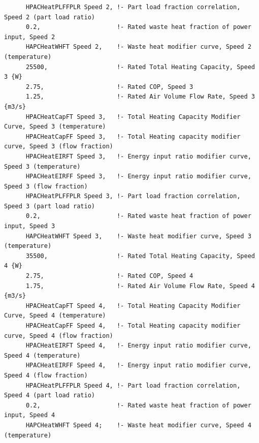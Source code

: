 \begin{lstlisting}
      HPACHeatPLFFPLR Speed 2, !- Part load fraction correlation, Speed 2 (part load ratio)
      0.2,                     !- Rated waste heat fraction of power input, Speed 2
      HAPCHeatWHFT Speed 2,    !- Waste heat modifier curve, Speed 2 (temperature)
      25500,                   !- Rated Total Heating Capacity, Speed 3 {W}
      2.75,                    !- Rated COP, Speed 3
      1.25,                    !- Rated Air Volume Flow Rate, Speed 3 {m3/s}
      HPACHeatCapFT Speed 3,   !- Total Heating Capacity Modifier Curve, Speed 3 (temperature)
      HPACHeatCapFF Speed 3,   !- Total Heating capacity modifier curve, Speed 3 (flow fraction)
      HPACHeatEIRFT Speed 3,   !- Energy input ratio modifier curve, Speed 3 (temperature)
      HPACHeatEIRFF Speed 3,   !- Energy input ratio modifier curve, Speed 3 (flow fraction)
      HPACHeatPLFFPLR Speed 3, !- Part load fraction correlation, Speed 3 (part load ratio)
      0.2,                     !- Rated waste heat fraction of power input, Speed 3
      HAPCHeatWHFT Speed 3,    !- Waste heat modifier curve, Speed 3 (temperature)
      35500,                   !- Rated Total Heating Capacity, Speed 4 {W}
      2.75,                    !- Rated COP, Speed 4
      1.75,                    !- Rated Air Volume Flow Rate, Speed 4 {m3/s}
      HPACHeatCapFT Speed 4,   !- Total Heating Capacity Modifier Curve, Speed 4 (temperature)
      HPACHeatCapFF Speed 4,   !- Total Heating capacity modifier curve, Speed 4 (flow fraction)
      HPACHeatEIRFT Speed 4,   !- Energy input ratio modifier curve, Speed 4 (temperature)
      HPACHeatEIRFF Speed 4,   !- Energy input ratio modifier curve, Speed 4 (flow fraction)
      HPACHeatPLFFPLR Speed 4, !- Part load fraction correlation, Speed 4 (part load ratio)
      0.2,                     !- Rated waste heat fraction of power input, Speed 4
      HAPCHeatWHFT Speed 4;    !- Waste heat modifier curve, Speed 4 (temperature)



\end{lstlisting}
